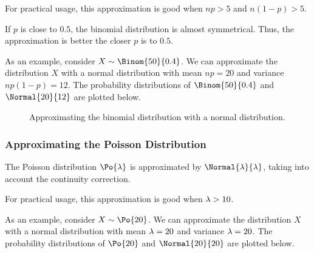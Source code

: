 For practical usage, this approximation is good when $np > 5$ and $n(1-p) > 5$.

If $p$ is close to $0.5$, the binomial distribution is almost symmetrical. Thus, the approximation is better the closer $p$ is to $0.5$.

As an example, consider $X \sim \Binom{50}{0.4}$. We can approximate the distribution $X$ with a normal distribution with mean $np = 20$ and variance $np(1-p) = 12$. The probability distributions of $\Binom{50}{0.4}$ and $\Normal{20}{12}$ are plotted below.

\begin{figure}[H]
    \centering
    \caption{Approximating the binomial distribution with a normal distribution.}
\end{figure}

\subsubsection{Approximating the Poisson Distribution}

\begin{proposition}
    The Poisson distribution $\Po{\l}$ is approximated by $\Normal{\l}{\l}$, taking into account the continuity correction.
\end{proposition}

For practical usage, this approximation is good when $\lambda > 10$.

As an example, consider $X \sim \Po{20}$. We can approximate the distribution $X$ with a normal distribution with mean $\lambda = 20$ and variance $\lambda = 20$. The probability distributions of $\Po{20}$ and $\Normal{20}{20}$ are plotted below.

